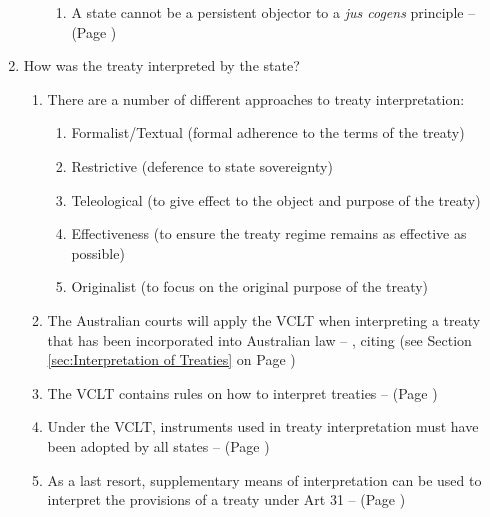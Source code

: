 \begin{enumerate}
\begin{enumerate}
\begin{enumerate}
            \item A state cannot be a persistent objector to a \textit{jus cogens} principle --  (Page \pageref{report:2019 ILC Conc. 14})
        \end{enumerate}
    \end{enumerate}
    \item How was the treaty interpreted by the state?
    \begin{enumerate}
        \item There are a number of different approaches to treaty interpretation:
        \begin{enumerate}
            \item Formalist/Textual (formal adherence to the terms of the treaty)
            \item Restrictive (deference to state sovereignty)
            \item Teleological (to give effect to the object and purpose of the treaty)
            \item Effectiveness (to ensure the treaty regime remains as effective as possible)
            \item Originalist (to focus on the original purpose of the treaty)
        \end{enumerate}
        \item The Australian courts will apply the VCLT when interpreting a treaty that has been incorporated into Australian law -- , citing  (see Section \ref{sec:Interpretation of Treaties} on Page \pageref{sec:Interpretation of Treaties})
        \item The VCLT contains rules on how to interpret treaties --  (Page \pageref{VCLT Art 31})
        \item Under the VCLT, instruments used in treaty interpretation must have been adopted by all states --  (Page \pageref{case:Antarctic Whaling})
        \item As a last resort, supplementary means of interpretation can be used to interpret the provisions of a treaty under Art 31 --  (Page \pageref{VCLT Art 32})
    \end{enumerate}

\end{enumerate}
